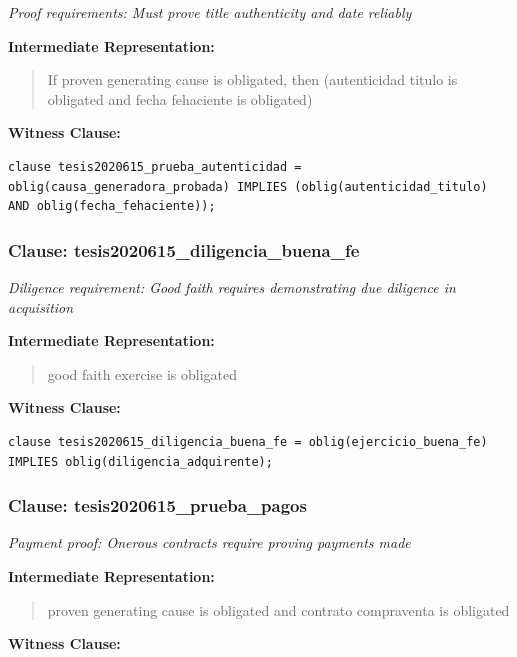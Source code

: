 \documentclass[11pt,a4paper]{article}
\begin{document}
\textit{Proof requirements: Must prove title authenticity and date reliably}

\textbf{Intermediate Representation:}

\begin{quote}
If proven generating cause is obligated, then (autenticidad titulo is obligated and fecha fehaciente is obligated)
\end{quote}

\textbf{Witness Clause:}

\begin{lstlisting}[style=witnessstyle, language=Witness]
clause tesis2020615_prueba_autenticidad = oblig(causa_generadora_probada) IMPLIES (oblig(autenticidad_titulo) AND oblig(fecha_fehaciente));
\end{lstlisting}

\subsubsection{Clause: tesis2020615\_diligencia\_buena\_fe}

\textit{Diligence requirement: Good faith requires demonstrating due diligence in acquisition}

\textbf{Intermediate Representation:}

\begin{quote}
good faith exercise is obligated
\end{quote}

\textbf{Witness Clause:}

\begin{lstlisting}[style=witnessstyle, language=Witness]
clause tesis2020615_diligencia_buena_fe = oblig(ejercicio_buena_fe) IMPLIES oblig(diligencia_adquirente);
\end{lstlisting}

\subsubsection{Clause: tesis2020615\_prueba\_pagos}

\textit{Payment proof: Onerous contracts require proving payments made}

\textbf{Intermediate Representation:}

\begin{quote}
proven generating cause is obligated and contrato compraventa is obligated
\end{quote}

\textbf{Witness Clause:}
\end{document}
